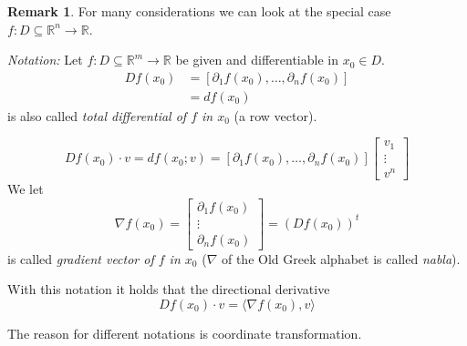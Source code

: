\documentclass[a4paper,landscape,twocolumn]{article}
\theoremstyle{definition}
\newtheorem{rem}{Remark}
\begin{document}
\begin{rem}
  For many considerations we can look at the
  special case $f: D \subseteq \mathbb R^n \to \mathbb R$.

  \emph{Notation:} Let $f: D \subseteq \mathbb R^m \to \mathbb R$
  be given and differentiable in $x_0 \in D$.
  \begin{align*}
    Df(x_0) &= [\partial_1 f(x_0), \ldots, \partial_n f(x_0)] \\
            &= df(x_0)
  \end{align*}
  is also called \emph{total differential of $f$ in $x_0$} (a row vector).

  \[ Df(x_0) \cdot v = df(x_0; v) = [\partial_1 f(x_0), \ldots, \partial_n f(x_0)] \begin{bmatrix} v_1 \\ \vdots \\ v^n \end{bmatrix} \]
  We let
  \[
  \nabla f(x_0) = \begin{bmatrix} \partial_1 f(x_0) \\ \vdots \\ \partial_n f(x_0) \end{bmatrix}
  = (Df(x_0))^t
  \]
  is called \emph{gradient vector of $f$ in $x_0$} ($\nabla$ of the Old Greek alphabet is called \emph{nabla}).

  With this notation it holds that the directional derivative
  \[ Df(x_0) \cdot v = \langle \nabla f(x_0), v\rangle \]

  The reason for different notations is coordinate transformation.


\end{rem}
\end{document}
